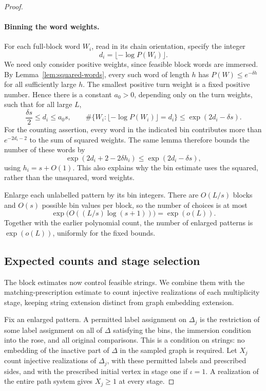 \begin{proof}
\paragraph{Binning the word weights.}
For each full-block word \(W_i\), read in its chain orientation, specify
the integer
\[
 d_i=\lfloor-\log P(W_i)\rfloor.
\]
We need only consider positive weights, since feasible block words are
immersed.  By Lemma~\ref{lem:squared-words}, every such word of length
\(h\) has \(P(W)\le e^{-\delta h}\) for all sufficiently large \(h\).
The smallest positive turn weight is a fixed positive number.  Hence
there is a constant \(a_0>0\), depending only on the turn weights, such
that for all large \(L\),
\begin{equation}
 \frac{\delta s}{2}\le d_i\le a_0s,
 \qquad
 \#\{W_i:\lfloor-\log P(W_i)\rfloor=d_i\}
 \le\exp(2d_i-\delta s).
 \label{eq:entropy-bins}
\end{equation}
For the counting assertion, every word in the indicated bin contributes
more than \(e^{-2d_i-2}\) to the sum of squared weights.  The same lemma
therefore bounds the number of these words by
\[
 \exp(2d_i+2-2\delta h_i)\le\exp(2d_i-\delta s),
\]
using \(h_i=s+O(1)\).  This also explains why the bin estimate uses the
squared, rather than the unsquared, word weights.

Enlarge each unlabelled pattern by its bin integers.  There are
\(O(L/s)\) blocks and \(O(s)\) possible bin values per block, so the
number of choices is at most
\[
 \exp\bigl(O((L/s)\log(s+1))\bigr)=\exp(o(L)).
\]
Together with the earlier polynomial count, the number of enlarged
patterns is \(\exp(o(L))\), uniformly for the fixed bounds.

\subsection*{Expected counts and stage selection}
The block estimates now control feasible strings. We combine them with
the matching-prescription estimate to count injective realizations of
each multiplicity stage, keeping string extension distinct from graph
embedding extension.

Fix an enlarged pattern.  A permitted label assignment on \(\Delta_j\)
is the restriction of some label assignment on all of \(\Delta\)
satisfying the bins, the immersion condition into the rose, and all
original comparisons.  This is a condition on strings: no embedding
of the inactive part of \(\Delta\) in the sampled graph is required.
Let \(X_j\) count injective realizations of \(\Delta_j\), with these
permitted labels and prescribed sides, and with the prescribed initial
vertex in stage one if \(\iota=1\).  A realization of the entire path
system gives \(X_j\ge1\) at every stage.


\end{proof}
